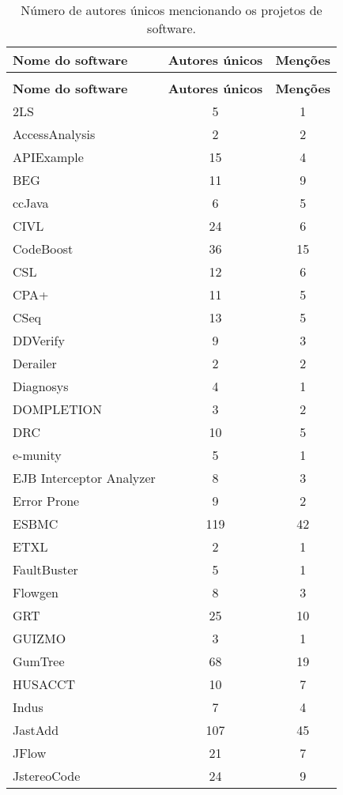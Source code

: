 
\begin{longtable}{ l c c }
\caption{Número de autores únicos mencionando os projetos de software.}
\label{authorship-table} \\
  \hline
  \hhline{ l c c |}
  \endfirsthead
  \hhline{ l c c |}
  \hline
  \textbf{Nome do software} & {\bf Autores únicos} & {\bf Menções} \\
  \hline
  \hhline{ l c c |}
  \endhead
  \hhline{---}
  \multicolumn{3}{c}{continua na próxima página} \\
  \hhline{---} \endfoot
  \hhline{---} \endlastfoot
  \textbf{Nome do software} & {\bf Autores únicos} & {\bf Menções} \\
  \hline
   2LS & 5 & 1 \\
   AccessAnalysis & 2 & 2 \\
   APIExample & 15 & 4 \\
   BEG & 11 & 9 \\
   ccJava & 6 & 5 \\
   CIVL & 24 & 6 \\
   CodeBoost & 36 & 15 \\
   CSL & 12 & 6 \\
   CPA+ & 11 & 5 \\
   CSeq & 13 & 5 \\
   DDVerify & 9 & 3 \\
   Derailer & 2 & 2 \\
   Diagnosys & 4 & 1 \\
   DOMPLETION & 3 & 2 \\
   DRC & 10 & 5 \\
   e-munity & 5 & 1 \\
   EJB Interceptor Analyzer & 8 & 3 \\
   Error Prone & 9 & 2 \\
   ESBMC & 119 & 42 \\
   ETXL & 2 & 1 \\
   FaultBuster & 5 & 1 \\
   Flowgen & 8 & 3 \\
   GRT & 25 & 10 \\
   GUIZMO & 3 & 1 \\
   GumTree & 68 & 19 \\
   HUSACCT & 10 & 7 \\
   Indus & 7 & 4 \\
   JastAdd & 107 & 45 \\
   JFlow & 21 & 7 \\
   JstereoCode & 24 & 9 \\

\end{longtable}
